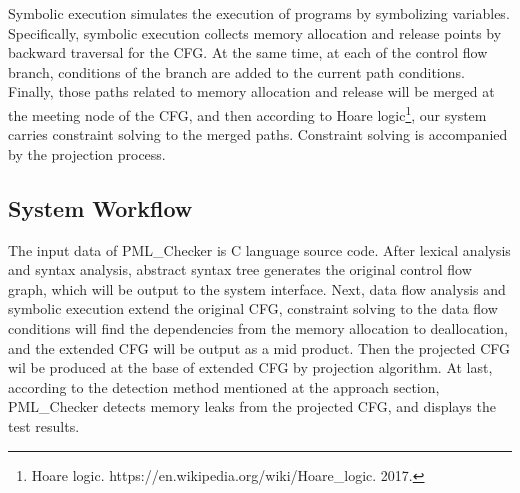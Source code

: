 Symbolic execution simulates the execution of programs by symbolizing variables. Specifically, symbolic execution collects memory allocation and release points by backward traversal for the CFG. At the same time, at each of the control flow branch, conditions of the branch are added to the current path conditions. Finally, those paths related to memory allocation and release will be merged at the meeting node of the CFG, and then according to Hoare logic\footnote{Hoare logic. https://en.wikipedia.org/wiki/Hoare\_logic. 2017.}, our system carries constraint solving to the merged paths. Constraint solving is accompanied by the projection process.  

\subsection{System Workflow}


The input data of PML\_Checker is C language source code. After lexical analysis and syntax analysis, abstract syntax tree generates the original control flow graph, which will be output to the system interface. Next, data flow analysis and symbolic execution extend the original CFG, constraint solving to the data flow conditions will find the dependencies from the memory allocation to deallocation, and the extended CFG will be output as a mid product. Then the projected CFG wil be produced at the base of extended CFG by projection algorithm. At last, according to the detection method mentioned at the approach section, PML\_Checker detects memory leaks from the projected CFG, and displays the test results. 


